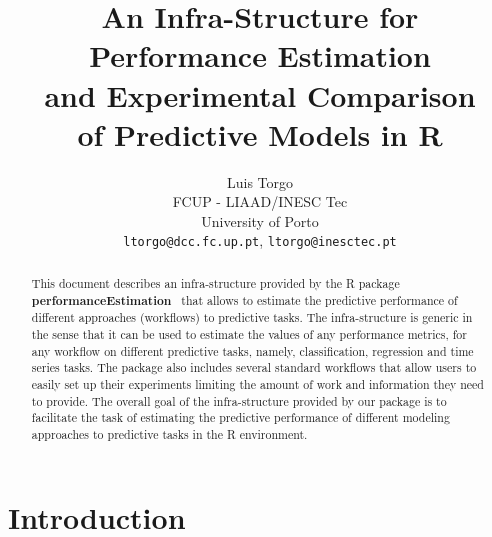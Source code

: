 \documentclass[10pt,a4paper]{article}\usepackage[]{graphicx}\usepackage[]{color}
\author{Luis Torgo\\FCUP - LIAAD/INESC Tec\\University of Porto\\
  \texttt{ltorgo@dcc.fc.up.pt}, \texttt{ltorgo@inesctec.pt}}
\title{An Infra-Structure for Performance Estimation\\ and Experimental Comparison\\ of Predictive Models in R}
\newcommand{\PE}{package \textbf{performanceEstimation}\ }
\begin{document}





\maketitle

\begin{abstract}
  
  This document describes an infra-structure provided by the R \PE
  that allows to estimate the predictive performance of different
  approaches (workflows) to predictive tasks.  The infra-structure is
  generic in the sense that it can be used to estimate the values of
  any performance metrics, for any workflow on different predictive
  tasks, namely, classification, regression and time series tasks. The
  package also includes several standard workflows that allow users to
  easily set up their experiments limiting the amount of work and
  information they need to provide. The overall goal of the
  infra-structure provided by our package is to facilitate the task of
  estimating the predictive performance of different modeling
  approaches to predictive tasks in the R environment.
   
\end{abstract}

\section{Introduction}
\end{document}
